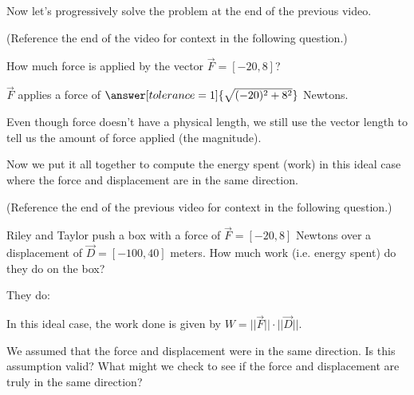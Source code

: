 \documentclass{ximera}
\begin{document}
Now let's progressively solve the problem at the end of the previous video.

\begin{problem}
    (Reference the end of the video for context in the following question.)

    How much force is applied by the vector $\vec{F}=[-20,8]$?

    $\vec{F}$ applies a force of $\answer[tolerance=1]{\sqrt{(-20)^2+8^2}}$ Newtons.

    \begin{feedback}
        Even though force doesn't have a physical length, we still use the vector length to tell us the amount of force applied (the magnitude).
    \end{feedback}
\end{problem}

Now we put it all together to compute the energy spent (work) in this ideal case where the force and displacement are in the same direction.


\begin{problem}
    (Reference the end of the previous video for context in the following question.)

    Riley and Taylor push a box with a force of $\vec{F}=[-20,8]$ Newtons over a displacement of $\vec{D}=[-100,40]$ meters. How much work (i.e. energy spent) do they do on the box?

    They do:

    \begin{selectAll}
    \end{selectAll}

    \begin{feedback}
        In this ideal case, the work done is given by $W=||\vec{F}||\cdot||\vec{D}||$.
    \end{feedback}

\end{problem}

We assumed that the force and displacement were in the same direction. Is this assumption valid? What might we check to see if the force and displacement are truly in the same direction?

\begin{center}
\end{center}
\end{document}
